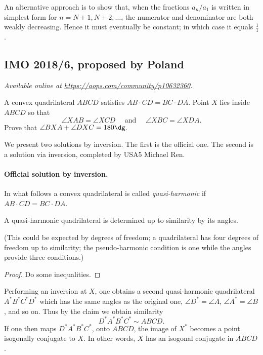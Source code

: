 \documentclass[11pt]{scrartcl}
\begin{document}
\begin{remark*}
  An alternative approach is to show that, when the fractions $a_n / a_1$
  is written in simplest form for $n = N+1, N+2, \dots$,
  the numerator and denominator are both weakly decreasing.
  Hence it must eventually be constant; in which case it equals $\frac11$.
\end{remark*}
\pagebreak

\subsection{IMO 2018/6, proposed by Poland}
\textsl{Available online at \url{https://aops.com/community/p10632360}.}
\begin{mdframed}[style=mdpurplebox,frametitle={Problem statement}]
A convex quadrilateral $ABCD$ satisfies $AB \cdot CD = BC \cdot DA$.
Point $X$ lies inside $ABCD$ so that
\[ \angle XAB=\angle XCD \quad \text{ and } \quad \angle XBC=\angle XDA. \]
Prove that $\angle BXA + \angle DXC=180\dg$.
\end{mdframed}
We present two solutions by inversion.
The first is the official one.
The second is a solution via inversion,
completed by USA5 Michael Ren.

\paragraph{Official solution by inversion.}
In what follows a convex quadrilateral is called
\emph{quasi-harmonic} if $AB \cdot CD = BC \cdot DA$.

\begin{claim*}
  A quasi-harmonic quadrilateral is determined
  up to similarity by its angles.
\end{claim*}
(This could be expected by degrees of freedom;
a quadrilateral has four degrees of freedom up to similarity;
the pseudo-harmonic condition is one
while the angles provide three conditions.)
\begin{proof}
  Do some inequalities.
\end{proof}

Performing an inversion at $X$, one obtains a
second quasi-harmonic quadrilateral
$A^\ast B^\ast C^\ast D^\ast$ which has the same angles
as the original one, $\angle D^\ast = \angle A$,
$\angle A^\ast = \angle B$, and so on.
Thus by the claim we obtain similarity
\[ D^\ast A^\ast B^\ast C^\ast \sim ABCD. \]
If one then maps $D^\ast A^\ast B^\ast C^\ast$,
onto $ABCD$, the image of $X^\ast$
becomes a point isogonally conjugate to $X$.
In other words, $X$ has an isogonal conjugate in $ABCD$.
\end{document}

